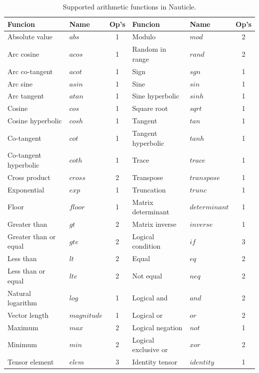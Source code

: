 \documentclass[a4paper,12pt,openany]{book}
\theoremstyle{break}
\begin{document}
\begin{table} [H]
\begin{center}
\caption{Supported arithmetic functions in Nauticle.}\label{tbl:arfc}
\begin{tabular}{ l l c | l l c }
\toprule[1.5pt]
\bf Funcion & \bf Name & \bf Op's & \bf Funcion & \bf Name & \bf Op's\\ 
\midrule
Absolute value & $abs$ & 1 & Modulo & $mod$ & 2 \\
Arc cosine & $acos$ & 1 & Random in range & $rand$ & 2 \\
Arc co-tangent & $acot$ & 1 & Sign & $sgn$ & 1 \\
Arc sine & $asin$ & 1 & Sine & $sin$ & 1 \\
Arc tangent & $atan$ & 1 & Sine hyperbolic & $sinh$ & 1 \\
Cosine & $cos$ & 1 & Square root & $sqrt$ & 1 \\
Cosine hyperbolic & $cosh$ & 1 & Tangent & $tan$ & 1 \\
Co-tangent & $cot$ & 1 & Tangent hyperbolic & $tanh$ & 1 \\
Co-tangent hyperbolic & $coth$ & 1 & Trace & $trace$ & 1 \\
Cross product & $cross$ & 2 & Transpose & $transpose$ & 1 \\
Exponential & $exp$ & 1 & Truncation & $trunc$ & 1 \\
Floor & $floor$ & 1 & Matrix determinant & $determinant$ & 1 \\
Greater than & $gt$ & 2 & Matrix inverse & $inverse$ & 1 \\
Greater than or equal & $gte$ & 2 & Logical condition & $if$ & 3 \\
Less than & $lt$ & 2 & Equal & $eq$ & 2 \\
Less than or equal & $lte$ & 2 & Not equal & $neq$ & 2 \\
Natural logarithm & $log$ & 1 & Logical and & $and$ & 2 \\
Vector length & $magnitude$ & 1 & Logical or & $or$ & 2 \\
Maximum & $max$ & 2 & Logical negation & $not$ & 1 \\
Minimum & $min$ & 2 & Logical exclusive or & $xor$ & 2 \\
Tensor element & $elem$ & 3 & Identity tensor & $identity$ & 1 \\
\bottomrule[1.25pt]
\end{tabular}
\end{center}
\end{table}
\end{document}

